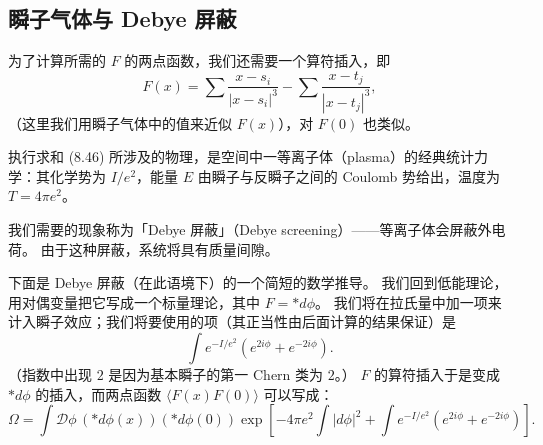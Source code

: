 
\subsection{瞬子气体与 Debye 屏蔽}

为了计算所需的 $F$ 的两点函数，我们还需要一个算符插入，即
\begin{equation}
  \tag{8.48}
  \label{eq:8-48}
  F(x)=\sum\frac{x-s_i}{|x-s_i|^3}-\sum\frac{x-t_j}{|x-t_j|^3},
\end{equation}
（这里我们用瞬子气体中的值来近似 $F(x)$），对 $F(0)$ 也类似。

执行求和 (8.46) 所涉及的物理，是空间中一等离子体（plasma）的经典统计力学：其化学势为 $I/e^2$，能量 $E$ 由瞬子与反瞬子之间的 Coulomb 势给出，温度为 $T=4\pi e^2$。

我们需要的现象称为「Debye 屏蔽」（Debye screening）——等离子体会屏蔽外电荷。
由于这种屏蔽，系统将具有质量间隙。

下面是 Debye 屏蔽（在此语境下）的一个简短的数学推导。
我们回到低能理论，用对偶变量把它写成一个标量理论，其中 $F=\ast d\phi$。
我们将在拉氏量中加一项来计入瞬子效应；我们将要使用的项（其正当性由后面计算的结果保证）是
\[
\int e^{-I/e^2}\left(e^{2i\phi}+e^{-2i\phi}\right).
\]
（指数中出现 $2$ 是因为基本瞬子的第一 Chern 类为 $2$。）
$F$ 的算符插入于是变成 $\ast d\phi$ 的插入，而两点函数 $\langle F(x)F(0)\rangle$ 可以写成：
\begin{equation}
  \tag{8.49}
  \label{eq:8-49}
  \Omega=\int\mathcal{D}\phi\,(\ast d\phi(x))(\ast d\phi(0))\exp\left[-4\pi e^2\int|d\phi|^2+\int e^{-I/e^2}\left(e^{2i\phi}+e^{-2i\phi}\right)\right].
\end{equation}

